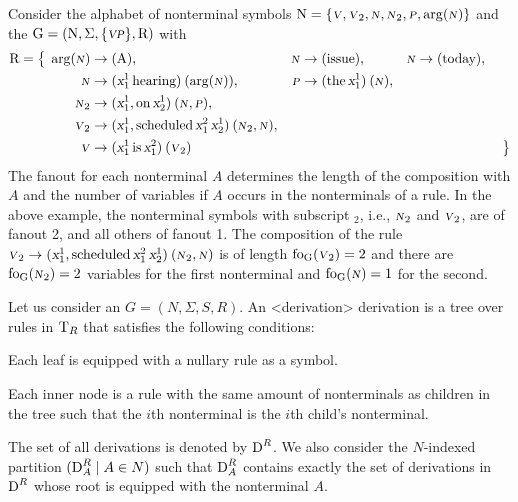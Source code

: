 \documentclass[../../document.tex]{subfiles}
\begin{document}
    \begin{example}\label{ex:lcfrs:rules}
        Consider the alphabet of nonterminal symbols \(\mathrm{N} = \{\textsc{\textsl{v}}, \textsc{\textsl{v}}_2, \textsc{\textsl{n}}, \textsc{\textsl{n}}_2, \textsc{\textsl{p}}, \arg(\textsc{\textsl{n}})\}\) and the  \(\mathrm{G} = (\mathrm{N}, \Sigma, \{\textsc{\textsl{vp}}\}, \mathrm{R})\) with
        \begin{align*}
            \mathrm{R} = \big\{\;
            \arg(\textsc{\textsl{n}}) &\to (\text{A}), &\textsc{\textsl{n}} &\to (\text{issue}), &\textsc{\textsl{n}} &\to (\text{today}), &\\
            \textsc{\textsl{n}} &\to (\textsl{x}_1^1 \, \text{hearing})\:(\arg(\textsc{\textsl{n}})), &\textsc{\textsl{p}} &\to (\text{the}\,\textsl{x}_1^1)\:(\textsc{\textsl{n}}), \\
            \textsc{\textsl{n}}_2 &\to (\textsl{x}_1^1, \text{on} \, \textsl{x}_2^1)\:(\textsc{\textsl{n}}, \textsc{\textsl{p}}), \\
            \textsc{\textsl{v}}_2 &\to (\textsl{x}_1^1, \text{scheduled} \, \textsl{x}_1^2 \, \textsl{x}_2^1)\:(\textsc{\textsl{n}}_2, \textsc{\textsl{n}}), \\
            \textsc{\textsl{v}} &\to (\textsl{x}_1^1 \, \text{is} \, \textsl{x}_1^2)\:(\textsc{\textsl{v}}_2)
            &&&&&\;\big\}
        \end{align*}
        The fanout for each nonterminal \(A\) determines the length of the composition with  \(A\) and the number of variables if \(A\) occurs in the  nonterminals of a rule.
        In the above example, the nonterminal symbols with subscript \(_2\), i.e., \(\textsc{\textsl{n}}_2\) and \(\textsc{\textsl{v}}_2\), are of fanout 2, and all others of fanout 1.
        The composition of the rule \(\textsc{\textsl{v}}_2 \to (\textsl{x}_1^1, \text{scheduled} \, \textsl{x}_1^2 \, \textsl{x}_2^1)\:(\textsc{\textsl{n}}_2, \textsc{\textsl{n}})\) is of length \(\operatorname{fo}_{\mathrm{G}}(\textsc{\textsl{v}}_2) = 2\) and there are \(\operatorname{fo}_{\mathrm{G}}(\textsc{\textsl{n}}_2) = 2\) variables for the first  nonterminal and \(\operatorname{fo}_{\mathrm{G}}(\textsc{\textsl{n}}) = 1\) for the second.
    \end{example}

    \begin{definition}[Derivation]
        Let us consider an  \(G = (N, \varSigma, S, R)\).
        An <derivation>{ derivation} is a tree over rules in \(\operatorname{T}_R\) that satisfies the following conditions:
        \begin{compactitem}
            \item Each leaf is equipped with a nullary rule as a symbol.
            \item Each inner node is a rule with the same amount of  nonterminals as children in the tree such that the \(i\)th  nonterminal is the \(i\)th child's  nonterminal.
        \end{compactitem}
        The set of all  derivations is denoted by \(\operatorname{D}^R\).
        We also consider the \(N\)-indexed partition \((\operatorname{D}^R_A \mid A \in N)\) such that \(\operatorname{D}^R_A\) contains exactly the set of derivations in \(\operatorname{D}^R\) whose root is equipped with the  nonterminal \(A\).
    \end{definition}
\end{document}
